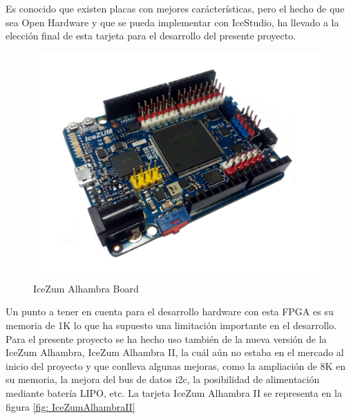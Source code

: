 Es conocido que existen placas con mejores carácterísticas, pero el hecho de que sea Open Hardware y que se pueda implementar con IceStudio, ha llevado a la elección final de esta tarjeta para el desarrollo del presente proyecto.\newline
\begin{center}
\begin{figure}[H]
	\center
	\includegraphics[scale=0.4]{imagenes/EstadoArte/IceZumAlhambra.pdf}
	\caption{IceZum Alhambra Board}
	\label{fig:IceZumAlhambraI}
\end{figure} 
\end{center}
Un punto a tener en cuenta para el desarrollo hardware con esta FPGA es su memoria de 1K lo que ha supuesto una limitación importante en el desarrollo. Para el presente proyecto se ha hecho uso también de la nueva versión de la IceZum Alhambra, IceZum Alhambra II, la cuál aún no estaba en el mercado al inicio del proyecto y que conlleva algunas mejoras, como la ampliación de 8K en su memoria, la mejora del bus de datos i2c, la posibilidad de alimentación mediante batería LIPO, etc. \newline
La tarjeta IceZum Alhambra II se representa en la figura \ref{fig: IceZumAlhambraII}
